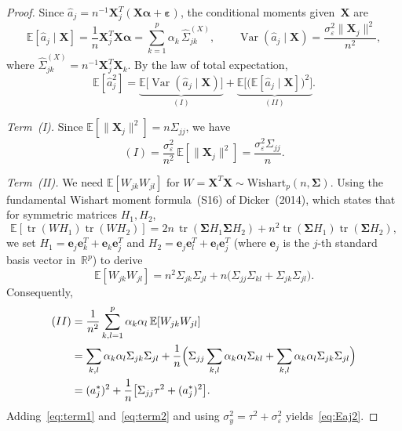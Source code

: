 \documentclass[11pt]{article}
\newcommand{\R}{\mathbb{R}}
\newcommand{\E}{\mathbb{E}}
\newcommand{\Var}{\operatorname{Var}}
\newcommand{\tr}{\operatorname{tr}}
\newcommand{\X}{\bm{X}}
\newcommand{\bSig}{\bm{\Sigma}}
\newcommand{\bal}{\bm{\alpha}}
\newcommand{\beps}{\bm{\varepsilon}}
\newcommand{\be}{\bm{e}}
\begin{document}
\begin{proof}
Since $\hat{a}_j = n^{-1}\X_j^{T}(\X\bal+\beps)$, the conditional moments
given~$\X$ are
\begin{equation}\label{eq:cond_moments_aj}
  \E[\hat{a}_j\mid\X]
  = \frac{1}{n}\X_j^{T}\X\bal
  = \sum_{k=1}^{p}\alpha_k\,\hat\Sigma_{jk}^{(X)},
  \qquad
  \Var(\hat{a}_j\mid\X)
  = \frac{\sigma_\varepsilon^{2}\|\X_j\|^{2}}{n^{2}},
\end{equation}
where $\hat\Sigma_{jk}^{(X)}=n^{-1}\X_j^{T}\X_k$.  By the law of total
expectation,
\begin{equation}\label{eq:total_var}
  \E[\hat{a}_j^{2}]
  = \underbrace{\E\bigl[\Var(\hat{a}_j\mid\X)\bigr]}_{(I)}
    + \underbrace{\E\bigl[\bigl(\E[\hat{a}_j\mid\X]\bigr)^{2}\bigr]}_{(II)}.
\end{equation}

\medskip\noindent\emph{Term~(I).}\;
Since $\E[\|\X_j\|^{2}]=n\Sigma_{jj}$, we have
\begin{equation}\label{eq:term1}
  (I) = \frac{\sigma_\varepsilon^{2}}{n^{2}}\,\E[\|\X_j\|^{2}]
       = \frac{\sigma_\varepsilon^{2}\Sigma_{jj}}{n}.
\end{equation}

\medskip\noindent\emph{Term~(II).}\;
We need $\E[W_{jk}W_{jl}]$ for $W=\X^{T}\X\sim\text{Wishart}_p(n,\bSig)$.
Using the fundamental Wishart moment formula~(S16) of Dicker~(2014), which
states that for symmetric matrices $H_1,H_2$,
\begin{equation}\label{eq:S16_basic}
  \E[\tr(WH_1)\tr(WH_2)]
  = 2n\,\tr(\bSig H_1\bSig H_2)+n^{2}\tr(\bSig H_1)\tr(\bSig H_2),
\end{equation}
we set $H_1=\be_j\be_k^{T}+\be_k\be_j^{T}$ and $H_2=\be_j\be_l^{T}+\be_l\be_j^{T}$
(where $\be_j$ is the $j$-th standard basis vector in~$\R^p$) to derive
\begin{equation}\label{eq:wishart_second}
  \E[W_{jk}W_{jl}]
  = n^{2}\Sigma_{jk}\Sigma_{jl}+n\bigl(\Sigma_{jj}\Sigma_{kl}+\Sigma_{jk}\Sigma_{jl}\bigr).
\end{equation}
Consequently,
\begin{align}
  (II) &= \frac{1}{n^{2}}\sum_{k,l=1}^{p}\alpha_k\alpha_l\,\E[W_{jk}W_{jl}]
  \notag\\
  &= \sum_{k,l}\alpha_k\alpha_l\Sigma_{jk}\Sigma_{jl}
     + \frac{1}{n}\Bigl(\Sigma_{jj}\sum_{k,l}\alpha_k\alpha_l\Sigma_{kl}
     + \sum_{k,l}\alpha_k\alpha_l\Sigma_{jk}\Sigma_{jl}\Bigr)
  \notag\\
  &= (a_j^{*})^{2} + \frac{1}{n}\bigl[\Sigma_{jj}\tau^{2}+(a_j^{*})^{2}\bigr].
  \label{eq:term2}
\end{align}
Adding~\eqref{eq:term1} and~\eqref{eq:term2} and using
$\sigma_y^{2}=\tau^{2}+\sigma_\varepsilon^{2}$ yields~\eqref{eq:Eaj2}.
\end{proof}
\end{document}
